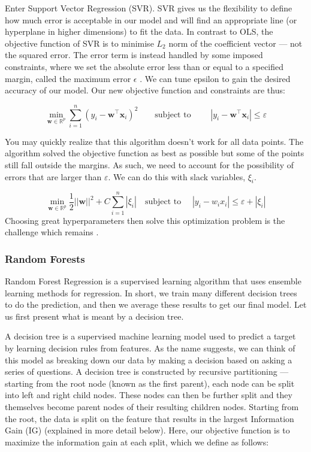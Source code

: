 \documentclass[twoside]{report}
\begin{document}
\begin{spacing}{1}
Enter Support Vector Regression (SVR). SVR gives us the flexibility to define how much error is acceptable in our model and will find an appropriate line (or hyperplane in higher dimensions) to fit the data. In contrast to OLS, the objective function of SVR is to minimise $L_2$ norm of the coefficient vector — not the squared error. The error term is instead handled by some imposed constraints, where we set the absolute error less than or equal to a specified margin, called the maximum error $\epsilon$ . We can tune epsilon to gain the desired accuracy of our model. Our new objective function and constraints are thus:

$$
\min _{\boldsymbol{w} \in \mathbb{R}^{p}} \sum_{i=1}^{n}\left(y_{i}-\boldsymbol{w}^{\top} \boldsymbol{x}_i\right)^{2} \quad \quad \text{subject to } \quad \quad\left|y_{i}-\boldsymbol{w}^{\top} \boldsymbol{x}_i\right| \leq \varepsilon
$$

You may quickly realize that this algorithm doesn’t work for all data points. The algorithm solved the objective function as best as possible but some of the points still fall outside the margins. As such, we need to account for the possibility of errors that are larger than $\varepsilon$. We can do this with slack variables, $\xi_i$.

\[
\min _{\boldsymbol{w} \in \mathbb{R}^{p}} \frac{1}{2}|| \boldsymbol{w}||^{2}+C \sum_{i=1}^{n}\left|\xi_{i}\right| \quad \text{subject to } \quad \left|y_{i}-w_{i} x_{i}\right| \leq \varepsilon+\left|\xi_{i}\right|
\]
Choosing great hyperparameters then solve this optimization problem is the challenge which remains \cite{noble2006support}.


\subsubsection{Random Forests}
Random Forest Regression is a supervised learning algorithm that uses ensemble learning methods for regression. In short, we train many different decision trees to do the prediction, and then we average these results to get our final model. Let us first present what is meant by a decision tree. 

A decision tree is a supervised machine learning model used to predict a target by learning decision rules from features. As the name suggests, we can think of this model as breaking down our data by making a decision based on asking a series of questions. A decision tree is constructed by recursive partitioning — starting from the root node (known as the first parent), each node can be split into left and right child nodes. These nodes can then be further split and they themselves become parent nodes of their resulting children nodes. Starting from the root, the data is split on the feature that results in the largest Information Gain (IG) (explained in more detail below). Here, our objective function is to maximize the information gain at each split, which we define as follows:



\end{spacing}
\end{document}
